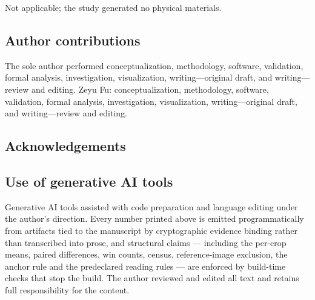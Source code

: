 Not applicable; the study generated no physical materials.

\subsection*{Author contributions}

\ifdefined\ANONYMOUS
The sole author performed conceptualization, methodology, software, validation,
formal analysis, investigation, visualization, writing---original draft, and
writing---review and editing.
\else
Zeyu Fu: conceptualization, methodology, software, validation, formal analysis,
investigation, visualization, writing---original draft, and writing---review
and editing.
\fi

\ifdefined\DRAFTTODO
\subsection*{Acknowledgements}

\fi

\subsection*{Use of generative AI tools}

Generative AI tools assisted with code preparation and language editing under
the author's direction. Every number printed above is emitted programmatically
from artifacts tied to the manuscript by cryptographic evidence binding rather
than transcribed into prose, and structural claims --- including the per-crop
means, paired differences, win counts, census, reference-image exclusion, the
anchor rule and the predeclared reading rules --- are enforced by build-time
checks that stop the build. The author reviewed and edited all text and retains
full responsibility for the content.
